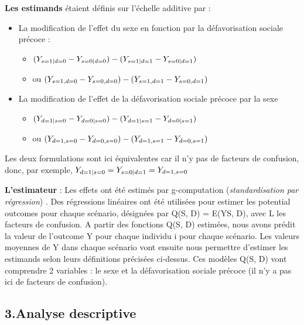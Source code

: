 \documentclass[
]{book}
\providecommand{\tightlist}{%
  \setlength{\itemsep}{0pt}\setlength{\parskip}{0pt}}
\begin{document}
\textbf{Les estimands} étaient définis sur l'échelle additive par :

\begin{itemize}
\tightlist
\item
  La modification de l'effet du sexe en fonction par la défavorisation sociale précoce :

  \begin{itemize}
  \tightlist
  \item
    \(\small (Y_{s=1|d=0} - Y_{s=0|d=0}) - (Y_{s=1|d=1} - Y_{s=0|d=1})\)
  \item
    ou \(\small (Y_{s=1,d=0} - Y_{s=0,d=0}) - (Y_{s=1,d=1} - Y_{s=0,d=1})\)
  \end{itemize}
\item
  La modification de l'effet de la défavorisation sociale précoce par la sexe

  \begin{itemize}
  \tightlist
  \item
    \(\small (Y_{d=1|s=0} - Y_{d=0|s=0}) - (Y_{d=1|s=1} - Y_{d=0|s=1})\)
  \item
    ou \(\small (Y_{d=1,s=0} - Y_{d=0,s=0}) - (Y_{d=1,s=1} - Y_{d=0,s=1})\)
  \end{itemize}
\end{itemize}

Les deux formulations sont ici équivalentes car il n'y pas de facteurs de confusion, donc, par exemple, \(\small Y_{d=1|s=0} = Y_{s=0|d=1} = Y_{d=1,s=0}\)

\textbf{L'estimateur} :
Les effets ont été estimés par g-computation (\emph{standardisation par régression}) \citet{hernan2020causal}.
Des régressions linéaires ont été utilisées pour estimer les potential outcomes pour chaque scénario, désignées par Q(S, D) = E(Y\textbar S, D), avec L les facteurs de confusion.
A partir des fonctions Q(S, D) estimées, nous avons prédit la valeur de l'outcome Y pour chaque individu i
pour chaque scénario. Les valeurs moyennes de Y dans chaque scénario vont ensuite nous permettre d'estimer les estimands selon leurs définitions précisées ci-dessus.
Ces modèles Q(S, D) vont comprendre 2 variables : le sexe et la défavorisation sociale précoce (il n'y a pas ici de facteurs de confusion).

\hypertarget{analyse-descriptive}{%
\subsection*{3.Analyse descriptive}\label{analyse-descriptive}}
\end{document}
